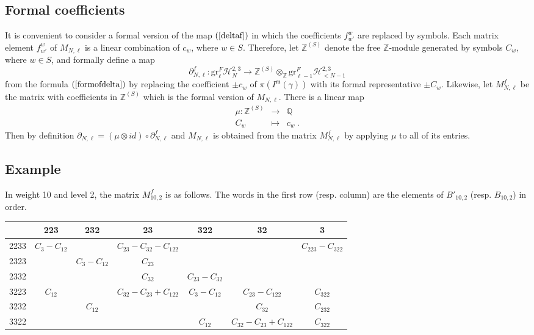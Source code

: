 \documentclass[10pt]{amsart}
\theoremstyle{definition}
\theoremstyle{remark}
\numberwithin{equation}{section}
\newcommand{\Z}{\mathbb Z}
\newcommand{\gr}{\mathrm{gr}}
\newcommand{\Ho}{\mathcal{H}}
\newcommand{\Imot}{I^{\mathfrak{m}}}
\newcommand{\Q}{\mathbb Q}
\newcommand{\To}{\longrightarrow}
\begin{document}
 
\subsection{Formal coefficients} It is convenient to consider a formal version of the map $(\ref{deltaf})$ in which the coefficients $f^w_{w'}$ are replaced by symbols. 
Each matrix element $f^w_{w'}$ of $M_{N,\ell}$ is a linear combination of $c_w$, where $w\in S$. 
Therefore, let $\Z^{(S)}$ denote the free $\Z$-module generated by symbols $C_w$, where $w\in S$, and formally define a map 
$$\partial^f_{N,\ell} : \gr^F_{\ell} \Ho_N^{2,3}  \To  \Z^{(S)} \otimes_{\Z} \gr^F_{\ell-1}\Ho^{2,3}_{<N-1} $$
from the formula $(\ref{formofdelta})$ by replacing the coefficient $\pm c_w$ of $\pi(\Imot(\gamma))$ with its formal representative   $\pm C_{w}$.
 Likewise, let $M^f_{N,\ell}$ be the matrix with coefficients in $\Z^{(S)}$ which is the formal  version of  $M_{N,\ell}$. There is a linear map 
\begin{eqnarray} \label{mudef}
\mu:\Z^{(S)} & \To  & \Q   \\
C_w & \mapsto  & c_w\ . \nonumber
\end{eqnarray}
Then by definition  $\partial_{N,\ell} = (\mu\otimes id)  \circ \partial^f_{N,\ell}$ and $M_{N,\ell}$ is obtained from the matrix $M^f_{N,\ell}$ by applying $\mu$ to  all of its entries. 
\subsection{Example}
In weight 10 and level 2, the matrix $M^f_{10,2}$ is as  follows. The words in the first row (resp. column) are the elements of $B'_{10,2}$ (resp. $B_{10,2}$) 
in order.

\begin{table}[h]
\begin{center}
{\small \begin{tabular}{|c|c|c|c|c|c|c|}
\hline
$ $ &223 &   232& 23 & 322 & 32 & 3 \\ 
\hline 
2233 &$C_{3} \! - \!C_{12}$& &$C_{23} \! - \!C_{32} \! - \!C_{122}$ & & & $C_{223} \! - \!C_{ 322}$  \\
2323 & &$C_{3} \! - \!C_{12}$& $C_{23}$ & & & \\
2332 &                   & & $C_{32}$& $C_{23} \! - \!C_{32}$ & & \\
3223 & $C_{12}$  &  & $C_{32}\!-\!C_{23}\!+\!C_{122}$ & $C_3 \! - \!C_{12}$ & $C_{23} \! - \!C_{122}$  & $C_{322}$ \\
3232 &                   & $C_{12}$  &         &                               & $C_{32}$                                           &     $C_{232}$          \\
3322 &                   &                   &         & $C_{12}$              &$C_{32} \! - \!C_{ 23} \! + \!C_{122}$  &     $C_{322}$      \\
\hline 
\end{tabular}}
\end{center}
\end{table}%
\end{document}
